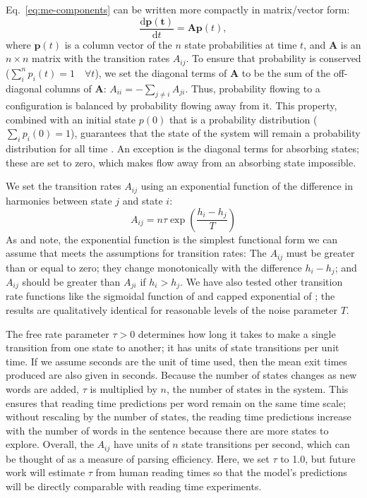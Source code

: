 \documentclass[a4paper, 12pt]{article}
\newcommand{\ddt}[1]{\frac{\mathrm{d}{#1}}{\mathrm{d}t}}
\begin{document}
Eq.~\ref{eq:me-components} can be written more compactly in matrix/vector form:
\begin{equation}\label{eq:me-matrix}
    \ddt{\mathbf{p(t)}} = \mathbf{Ap}(t),
\end{equation}
where $\mathbf{p}(t)$ is a column vector of the $n$ state probabilities
at time $t$, and $\mathbf{A}$ is an $n\times n$ matrix with the transition
rates $A_{ij}$. To ensure that probability is conserved ($\sum_i^n p_i(t) = 1
\quad \forall t$), we set the diagonal terms of $\mathbf{A}$ to be the sum of the
off-diagonal columns of $\mathbf{A}$: $A_{ii} = -\sum_{j\neq i} A_{ji}$. Thus,
probability flowing to a configuration is balanced by probability flowing away
from it. This property, combined with an initial state $p(0)$ that is a
probability distribution ($\sum_i p_i(0) = 1$), guarantees that the state of
the system will remain a probability distribution for all time
\citep{vankampen2007stochastic, haken1983synergetics, oppenheim1977stochastic}.
An exception is the diagonal terms for absorbing states; these are set to zero,
which makes flow away from an absorbing state impossible.

We set the transition rates $A_{ij}$ using an exponential function of the
difference in harmonies between state $j$ and state $i$:
\begin{equation}\label{arr-rate}
    A_{ij} = n \tau \exp\left(\frac{h_i - h_j}{T} \right)
\end{equation}
As \citet{haag2017modelling} and \citet{weidlich1991physics} note, the
exponential function is the simplest functional form we can assume that meets
the assumptions for transition rates: The $A_{ij}$ must be greater than or
equal to zero; they change monotonically with the difference $h_i - h_j$; and
$A_{ij}$ should be greater than $A_{ji}$ if $h_i > h_j$. We have also tested
other transition rate functions like the sigmoidal function of
\citet{glauber1963time} and capped exponential of
\citet{metropolis1953equation}; the results are qualitatively identical for
reasonable levels of the noise parameter $T$.

The free rate parameter $\tau > 0$ determines how long it takes to
make a single transition from one state to another; it has units of state
transitions per unit time. If we assume seconds are the unit of time used, then
the mean exit times produced are also given in seconds. Because the number of
states changes as new words are added, $\tau$ is multiplied by $n$, the number
of states in the system. This ensures that reading time predictions per word
remain on the same time scale; without rescaling by the number of states, the
reading time predictions increase with the number of words in the sentence
because there are more states to explore. Overall, the $A_{ij}$ have units of
$n$ state transitions per second, which can be thought of as a measure of
parsing efficiency. Here, we set $\tau$ to 1.0, but future work will estimate
$\tau$ from human reading times so that the model's predictions will be
directly comparable with reading time experiments.
\end{document}
